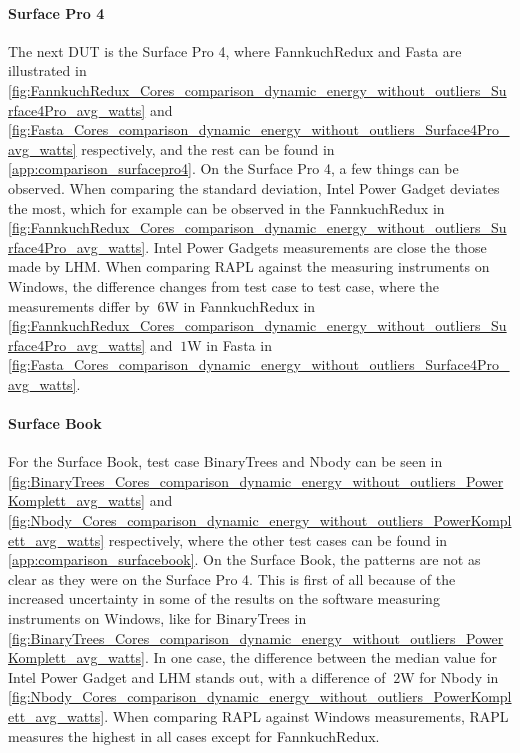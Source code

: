 \paragraph{Surface Pro 4}




The next DUT is the Surface Pro 4, where FannkuchRedux and Fasta are illustrated in \cref{fig:FannkuchRedux_Cores_comparison_dynamic_energy_without_outliers_Surface4Pro_avg_watts} and \cref{fig:Fasta_Cores_comparison_dynamic_energy_without_outliers_Surface4Pro_avg_watts} respectively, and the rest can be found in \cref{app:comparison_surfacepro4}. On the Surface Pro 4, a few things can be observed. When comparing the standard deviation, Intel Power Gadget deviates the most, which for example can be observed in the FannkuchRedux in \cref{fig:FannkuchRedux_Cores_comparison_dynamic_energy_without_outliers_Surface4Pro_avg_watts}. Intel Power Gadgets measurements are close the those made by LHM. When comparing RAPL against the measuring instruments on Windows, the difference changes from test case to test case,  where the measurements differ by $~6$W in FannkuchRedux in \cref{fig:FannkuchRedux_Cores_comparison_dynamic_energy_without_outliers_Surface4Pro_avg_watts} and $~1$W in Fasta in \cref{fig:Fasta_Cores_comparison_dynamic_energy_without_outliers_Surface4Pro_avg_watts}.

\paragraph{Surface Book}




For the Surface Book, test case BinaryTrees and Nbody can be seen in \cref{fig:BinaryTrees_Cores_comparison_dynamic_energy_without_outliers_PowerKomplett_avg_watts} and \cref{fig:Nbody_Cores_comparison_dynamic_energy_without_outliers_PowerKomplett_avg_watts} respectively, where the other test cases can be found in \cref{app:comparison_surfacebook}. On the Surface Book, the patterns are not as clear as they were on the Surface Pro 4. This is first of all because of the increased uncertainty in some of the results on the software measuring instruments on Windows, like for BinaryTrees in \cref{fig:BinaryTrees_Cores_comparison_dynamic_energy_without_outliers_PowerKomplett_avg_watts}. In one case, the difference between the median value for Intel Power Gadget and LHM stands out, with a difference of $~2$W for Nbody in \cref{fig:Nbody_Cores_comparison_dynamic_energy_without_outliers_PowerKomplett_avg_watts}. When comparing RAPL against Windows measurements, RAPL measures the highest in all cases except for FannkuchRedux.

